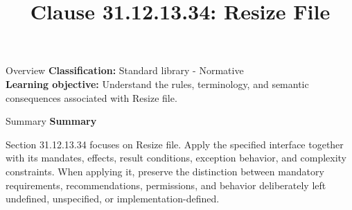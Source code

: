 \documentclass[10pt,letterpaper]{article}
\title{Clause 31.12.13.34: Resize File}
\author{}
\date{}
\begin{document}
\maketitle
\begin{CornellOverviewBox}{Overview}
\textbf{Classification:} Standard library - Normative\\[2pt]
\textbf{Learning objective:} Understand the rules, terminology, and semantic consequences associated with Resize file.
\end{CornellOverviewBox}\begin{CornellSummaryBox}{Summary}
{\sffamily\bfseries\color{Accent} Summary}\par\vspace{3pt}Section 31.12.13.34 focuses on Resize file. Apply the specified interface together with its mandates, effects, result conditions, exception behavior, and complexity constraints. When applying it, preserve the distinction between mandatory requirements, recommendations, permissions, and behavior deliberately left undefined, unspecified, or implementation-defined.
\end{CornellSummaryBox}
\end{document}
